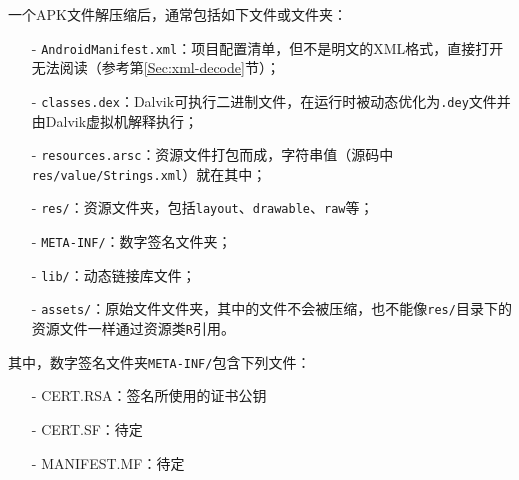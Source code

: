 一个APK文件解压缩后，通常包括如下文件或文件夹：
\begin{itemize}
  \item[-] \lstinline!AndroidManifest.xml!：项目配置清单，但不是明文的XML格式，直接打开无法阅读（参考第\ref{Sec:xml-decode}节）；
  \item[-] \lstinline!classes.dex!：Dalvik可执行二进制文件，在运行时被动态优化为\lstinline!.dey!文件并由Dalvik虚拟机解释执行；
  \item[-] \lstinline!resources.arsc!：资源文件打包而成，字符串值（源码中\lstinline!res/value/Strings.xml!）就在其中；
  \item[-] \lstinline!res/!：资源文件夹，包括\lstinline!layout!、\lstinline!drawable!、\lstinline!raw!等；
  \item[-] \lstinline!META-INF/!：数字签名文件夹；
  \item[-] \lstinline!lib/!：动态链接库文件；
  \item[-] \lstinline!assets/!：原始文件文件夹，其中的文件不会被压缩，也不能像\lstinline!res/!目录下的资源文件一样通过资源类\lstinline!R!引用。
\end{itemize}
其中，数字签名文件夹\lstinline!META-INF/!包含下列文件：
\begin{itemize}
  \item[-] CERT.RSA：签名所使用的证书公钥
  \item[-] CERT.SF：待定
  \item[-] MANIFEST.MF：待定
\end{itemize}

